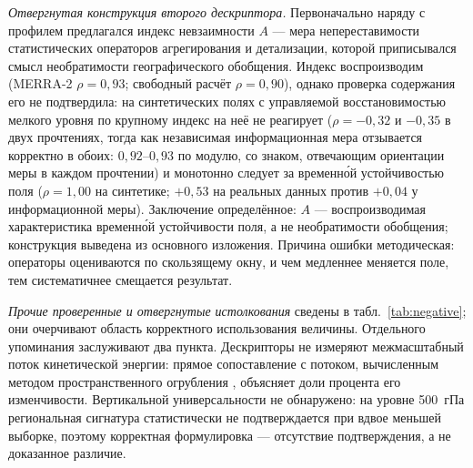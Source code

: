 \documentclass[11pt,a4paper]{article}
\begin{document}
\emph{Отвергнутая конструкция второго дескриптора.} Первоначально наряду с профилем предлагался индекс невзаимности $A$ --- мера непереставимости статистических операторов агрегирования и детализации, которой приписывался смысл необратимости географического обобщения. Индекс воспроизводим (MERRA-2 $\rho=0{,}93$; свободный расчёт $\rho=0{,}90$), однако проверка содержания его не подтвердила: на синтетических полях с управляемой восстановимостью мелкого уровня по крупному индекс на неё не реагирует ($\rho=-0{,}32$ и $-0{,}35$ в двух прочтениях, тогда как независимая информационная мера отзывается корректно в обоих: $0{,}92$--$0{,}93$ по модулю, со знаком, отвечающим ориентации меры в каждом прочтении) и монотонно следует за временн\'{о}й устойчивостью поля ($\rho=1{,}00$ на синтетике; $+0{,}53$ на реальных данных против $+0{,}04$ у информационной меры). Заключение определённое: $A$ --- воспроизводимая характеристика временн\'{о}й устойчивости поля, а не необратимости обобщения; конструкция выведена из основного изложения. Причина ошибки методическая: операторы оцениваются по скользящему окну, и чем медленнее меняется поле, тем систематичнее смещается результат.

\emph{Прочие проверенные и отвергнутые истолкования} сведены в табл.~\ref{tab:negative}; они очерчивают область корректного использования величины. Отдельного упоминания заслуживают два пункта. Дескрипторы не измеряют межмасштабный поток кинетической энергии: прямое сопоставление с потоком, вычисленным методом пространственного огрубления \cite{Germano1992,Aluie2018}, объясняет доли процента его изменчивости. Вертикальной универсальности не обнаружено: на уровне 500~гПа региональная сигнатура статистически не подтверждается при вдвое меньшей выборке, поэтому корректная формулировка --- отсутствие подтверждения, а не доказанное различие.
\end{document}
